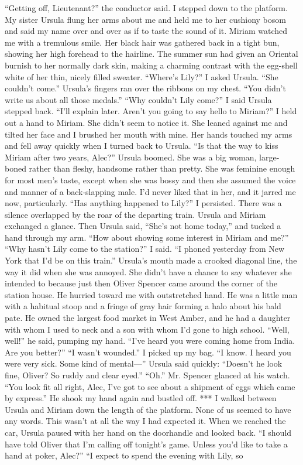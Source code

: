 \documentclass{novel}
\begin{document}

“Getting off, Lieutenant?” the conductor said. I stepped down to the platform. My sister Ursula flung her arms about me and held me to her cushiony bosom and said my name over and over as if to taste the sound of it. Miriam watched me with a tremulous smile. Her black hair was gathered back in a tight bun, showing her high forehead to the hairline. The summer sun had given an Oriental burnish to her normally dark skin, making a charming contrast with the egg-shell white of her thin, nicely filled sweater. “Where’s Lily?” I asked Ursula. “She couldn’t come.” Ursula’s fingers ran over the ribbons on my chest. “You didn’t write us about all those medals.” “Why couldn’t Lily come?” I said Ursula stepped back. “I’ll explain later. Aren’t you going to say hello to Miriam?” I held out a hand to Miriam. She didn’t seem to notice it. She leaned against me and tilted her face and I brushed her mouth with mine. Her hands touched my arms and fell away quickly when I turned back to Ursula. “Is that the way to kiss Miriam after two years, Alec?” Ursula boomed. She was a big woman, large-boned rather than fleshy, handsome rather than pretty. She was feminine enough for most men’s taste, except when she was bossy and then she assumed the voice and manner of a back-slapping male. I’d never liked that in her, and it jarred me now, particularly. “Has anything happened to Lily?” I persisted. There was a silence overlapped by the roar of the departing train. Ursula and Miriam exchanged a glance. Then Ursula said, “She’s not home today,” and tucked a hand through my arm. “How about showing some interest in Miriam and me?” “Why hasn’t Lily come to the station?” I said. “I phoned yesterday from New York that I’d be on this train.” Ursula’s mouth made a crooked diagonal line, the way it did when she was annoyed. She didn’t have a chance to say whatever she intended to because just then Oliver Spencer came around the corner of the station house. He hurried toward me with outstretched hand. He was a little man with a habitual stoop and a fringe of gray hair forming a halo about his bald pate. He owned the largest food market in West Amber, and he had a daughter with whom I used to neck and a son with whom I’d gone to high school. “Well, well!” he said, pumping my hand. “I’ve heard you were coming home from India. Are you better?” “I wasn’t wounded.” I picked up my bag. “I know. I heard you were very sick. Some kind of mental—” Ursula said quickly: “Doesn’t he look fine, Oliver? So ruddy and clear eyed.” “Oh.” Mr. Spencer glanced at his watch. “You look fit all right, Alec, I’ve got to see about a shipment of eggs which came by express.” He shook my hand again and bustled off. *** I walked between Ursula and Miriam down the length of the platform. None of us seemed to have any words. This wasn’t at all the way I had expected it. When we reached the car, Ursula paused with her hand on the doorhandle and looked back. “I should have told Oliver that I’m calling off tonight’s game. Unless you’d like to take a hand at poker, Alec?” “I expect to spend the evening with Lily, so 
\end{document}
